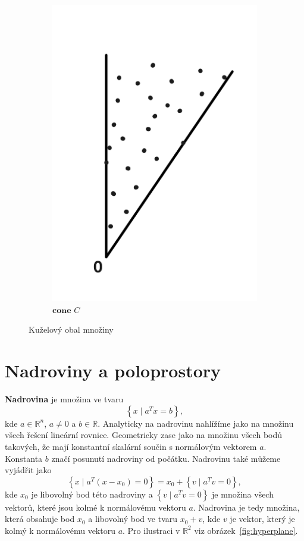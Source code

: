 \begin{figure}[h!]
    \begin{subfigure}[b]{0.3\textwidth}
        \centering
        \includegraphics[width=\textwidth]{img/cone_hull.png}
        \caption{$\textbf{cone }C$}
        \label{fig:cone_hull:b}
    \end{subfigure}
     
    \caption{Kuželový obal množiny}
    \label{fig:cone_hull}
\end{figure}


\section{Nadroviny a poloprostory}

\textbf{Nadrovina} je množina ve tvaru
$$
    \left\{ x \mid a^T x = b \right\},
$$
kde $a \in \mathbb{R}^n$, $a \neq 0$ a $b \in \mathbb{R}$. Analyticky na nadrovinu nahlížíme jako na množinu všech řešení lineární rovnice. Geometricky zase jako na množinu všech bodů takových, že mají konstantní skalární součin s normálovým vektorem $a$. Konstanta $b$ značí posunutí nadroviny od počátku. Nadrovinu také můžeme vyjádřit jako
$$
    \left\{ x \mid a^T (x - x_0) = 0 \right\} = x_0 + \left\{ v \mid a^T v = 0 \right\},
$$
kde $x_0$ je libovolný bod této nadroviny a $\left\{ v \mid a^T v = 0 \right\}$ je množina všech vektorů, které jsou kolmé k normálovému vektoru $a$. Nadrovina je tedy množina, která obsahuje bod $x_0$ a libovolný bod ve tvaru $x_0 + v$, kde $v$ je vektor, který je kolmý k normálovému vektoru $a$. Pro ilustraci v $\mathbb{R}^2$ viz obrázek~\ref{fig:hyperplane}.

